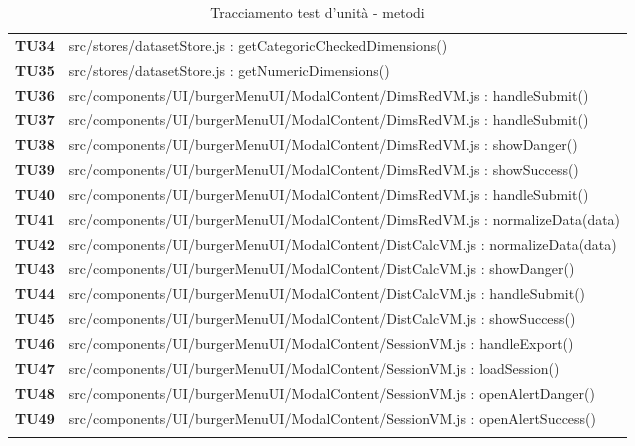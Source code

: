{\begin{longtable}{C{1.1cm} | L{15cm}}
\textbf{TU34} & src/stores/datasetStore.js : getCategoricCheckedDimensions()\\

\textbf{TU35} & src/stores/datasetStore.js : getNumericDimensions()\\

\textbf{TU36} & src/components/UI/burgerMenuUI/ModalContent/DimsRedVM.js : handleSubmit()\\

\textbf{TU37} & src/components/UI/burgerMenuUI/ModalContent/DimsRedVM.js : handleSubmit()\\

\textbf{TU38} & src/components/UI/burgerMenuUI/ModalContent/DimsRedVM.js : showDanger()\\

\textbf{TU39} & src/components/UI/burgerMenuUI/ModalContent/DimsRedVM.js : showSuccess()\\

\textbf{TU40} & src/components/UI/burgerMenuUI/ModalContent/DimsRedVM.js : handleSubmit()\\

\textbf{TU41} & src/components/UI/burgerMenuUI/ModalContent/DimsRedVM.js : normalizeData(data)\\

\textbf{TU42} & src/components/UI/burgerMenuUI/ModalContent/DistCalcVM.js : normalizeData(data)\\

\textbf{TU43} & src/components/UI/burgerMenuUI/ModalContent/DistCalcVM.js : showDanger()\\

\textbf{TU44} & src/components/UI/burgerMenuUI/ModalContent/DistCalcVM.js : handleSubmit()\\

\textbf{TU45} & src/components/UI/burgerMenuUI/ModalContent/DistCalcVM.js : showSuccess()\\

\textbf{TU46} & src/components/UI/burgerMenuUI/ModalContent/SessionVM.js : handleExport()\\	

\textbf{TU47} & src/components/UI/burgerMenuUI/ModalContent/SessionVM.js : loadSession()\\	

\textbf{TU48} & src/components/UI/burgerMenuUI/ModalContent/SessionVM.js : openAlertDanger()\\	

\textbf{TU49} & src/components/UI/burgerMenuUI/ModalContent/SessionVM.js : openAlertSuccess()\\	

		\caption{Tracciamento test d'unità - metodi}
\end{longtable}
}